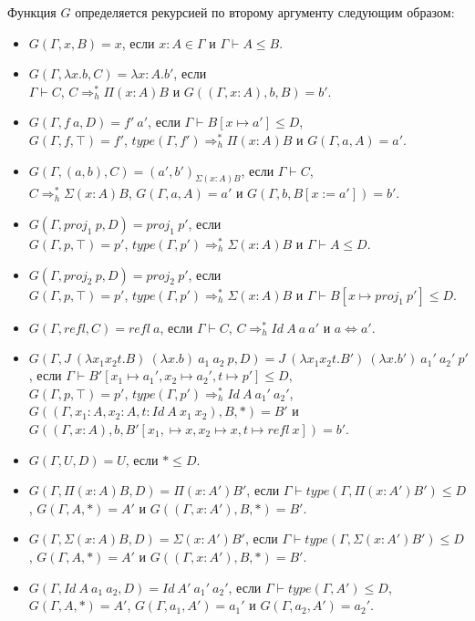 \documentclass{amsart}
\theoremstyle{definition}
\theoremstyle{remark}
\newcommand{\red}{\Rightarrow}
\newcommand{\deq}{\Leftrightarrow}
\numberwithin{figure}{section}
\begin{document}
Функция $G$ определяется рекурсией по второму аргументу следующим образом:
\begin{itemize}
\item $G(\Gamma, x, B) = x$, если $x : A \in \Gamma$ и $\Gamma \vdash A \leq B$.
\item $G(\Gamma, \lambda x. b, C) = \lambda x : A. b'$, если \\
    $\Gamma \vdash C$, $C \red_h^* \Pi (x : A) B$ и $G((\Gamma, x : A), b, B) = b'$.
\item $G(\Gamma, f\ a, D) = f'\ a'$, если $\Gamma \vdash B[x \mapsto a'] \leq D$, \\
    $G(\Gamma, f, \top) = f'$, $type(\Gamma, f') \red_h^* \Pi (x : A) B$ и $G(\Gamma, a, A) = a'$.
\item $G(\Gamma, (a, b), C) = (a', b')_{\Sigma (x : A) B}$, если $\Gamma \vdash C$, \\
    $C \red_h^* \Sigma (x : A) B$, $G(\Gamma, a, A) = a'$ и $G(\Gamma, b, B[x := a']) = b'$.
\item $G(\Gamma, proj_1\ p, D) = proj_1\ p'$, если \\
    $G(\Gamma, p, \top) = p'$, $type(\Gamma, p') \red_h^* \Sigma (x : A) B$ и $\Gamma \vdash A \leq D$.
\item $G(\Gamma, proj_2\ p, D) = proj_2\ p'$, если \\
    $G(\Gamma, p, \top) = p'$, $type(\Gamma, p') \red_h^* \Sigma (x : A) B$ и $\Gamma \vdash B[x \mapsto proj_1\ p'] \leq D$.
\item $G(\Gamma, refl, C) = refl\ a$, если $\Gamma \vdash C$, $C \red_h^* Id\ A\ a\ a'$ и $a \deq a'$.
\item $G(\Gamma, J\ (\lambda x_1 x_2 t. B)\ (\lambda x. b)\ a_1\ a_2\ p, D) = J\ (\lambda x_1 x_2 t. B')\ (\lambda x. b')\ a_1'\ a_2'\ p'$, если $\Gamma \vdash B'[x_1 \mapsto a_1', x_2 \mapsto a_2', t \mapsto p'] \leq D$, \\
    $G(\Gamma, p, \top) = p'$,
    $type(\Gamma, p') \red_h^* Id\ A\ a_1'\ a_2'$, \\
    $G((\Gamma, x_1 : A, x_2 : A, t : Id\ A\ x_1\ x_2), B, *) = B'$ и \\
    $G((\Gamma, x : A), b, B'[x_1, \mapsto x, x_2 \mapsto x, t \mapsto refl\ x]) = b'$.
\item $G(\Gamma, U, D) = U$, если $* \leq D$.
\item $G(\Gamma, \Pi (x : A) B, D) = \Pi (x : A') B'$, если $\Gamma \vdash type(\Gamma, \Pi (x : A') B') \leq D$,
    $G(\Gamma, A, *) = A'$ и $G((\Gamma, x : A'), B, *) = B'$.
\item $G(\Gamma, \Sigma (x : A) B, D) = \Sigma (x : A') B'$, если $\Gamma \vdash type(\Gamma, \Sigma (x : A') B') \leq D$,
    $G(\Gamma, A, *) = A'$ и $G((\Gamma, x : A'), B, *) = B'$.
\item $G(\Gamma, Id\ A\ a_1\ a_2, D) = Id\ A'\ a_1'\ a_2'$, если $\Gamma \vdash type(\Gamma, A') \leq D$,
    $G(\Gamma, A, *) = A'$, $G(\Gamma, a_1, A') = a_1'$ и $G(\Gamma, a_2, A') = a_2'$.
\end{itemize}
\end{document}
